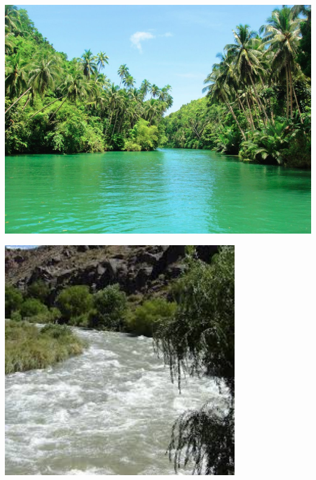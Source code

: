 \begin{frame}
    \hspace{0.8cm}
\begin{minipage}{0.45\textwidth}
\includegraphics[width=1\textwidth]{Resources/Images/calmriver.png}
\end{minipage}
\hspace{1.1cm}
\begin{minipage}{0.45\textwidth}
\includegraphics[width=0.75\textwidth]{Resources/Images/fastriver.jpeg}
\end{minipage}
\end{frame}

